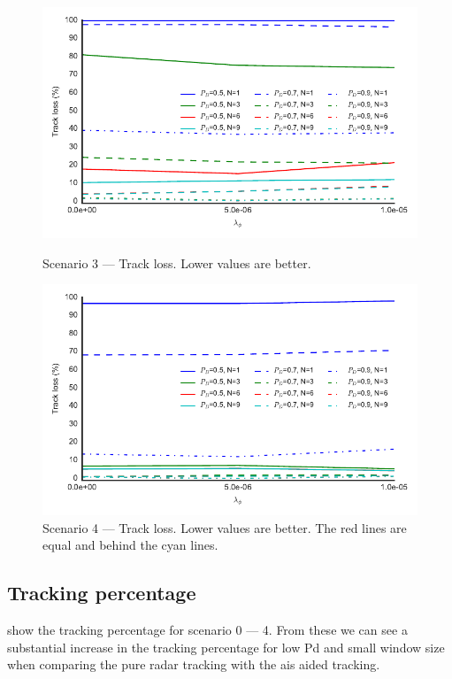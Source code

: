 \begin{figure}
\centering
\includegraphics{Figures/plots/Scenario3_Tracking-TrackLoss.pdf}
\caption{Scenario 3 --- Track loss. Lower values are better.}\label{fig:scenario3_track_loss}
\includegraphics{Figures/plots/Scenario4_Tracking-TrackLoss.pdf}
\caption{Scenario 4 --- Track loss. Lower values are better. The red lines are equal and behind the cyan lines.}\label{fig:scenario4_track_loss}
\end{figure}
\clearpage

\subsection{Tracking percentage}
 show the tracking percentage for scenario 0 --- 4. From these we can see a substantial increase in the tracking percentage for low \gls{Pd} and small window size when comparing the pure radar tracking with the \gls{ais} aided tracking. 


